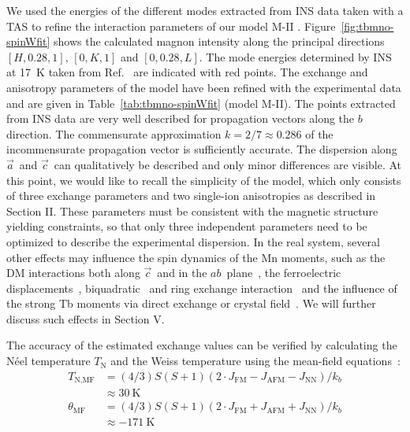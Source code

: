 \documentclass[aps,prb,twocolumn,superscriptaddress,showpacs,floatfix]{revtex4-2}
\newcommand{\aaxis}{$\vec{a}$}
\newcommand{\caxis}{$\vec{c}$}
\newcommand{\abplane}{$ab$}
\newcommand{\bcplane}{$bc$}
\newcommand{\mubohr}{\,$\mu_B$}
\begin{document}
We used the energies of the different modes extracted from INS data taken with a TAS \cite{Senff2007,Senff2008a} to refine the interaction parameters of our model M-II \cite{note-senff}. Figure~\ref{fig:tbmno-spinWfit} shows the calculated magnon intensity along the principal directions $[H,0.28,1]$, $[0,K,1]$ and $[0,0.28,L]$. The mode energies determined by INS at \SI{17}{\kelvin} taken from Ref.~\cite{Senff2007,Senff2008a} are indicated with red points. 
The exchange and anisotropy parameters of the model have been refined with the experimental data and are given in Table~\ref{tab:tbmno-spinWfit} (model M-II).
The points extracted from INS data are very well described for propagation vectors along the $b$ direction.
The commensurate approximation $k=2/7\approx0.286$ of the incommensurate propagation vector is sufficiently accurate. The dispersion along \aaxis\ and \caxis\ can qualitatively be described and only minor differences are visible.
At this point, we would like to recall the simplicity of the model, which only consists of three exchange parameters and two single-ion anisotropies as described in Section II.
These parameters must be consistent with the magnetic structure yielding constraints, so that only three
independent parameters need to be optimized to describe the experimental dispersion.
In the real system, several other effects may influence the spin dynamics of the Mn moments, such as the DM interactions both along \caxis\ and in the \abplane\ plane~\cite{Mochizuki2009}, the ferroelectric displacements~\cite{Malashevich2009a}, biquadratic~\cite{Mochizuki2010c} and ring exchange interaction~\cite{Fedorova2015} and the influence of the strong Tb moments via direct exchange or crystal field~\cite{Prokhnenko2007,Mostovoy2006}.
We will further discuss such effects in Section V.



The accuracy of the estimated exchange values can be verified by calculating the N\'eel temperature $T_{\textrm{N}}$ and the Weiss temperature using the mean-field equations~\cite{Tovar1999}:
\begin{align}
     T_{\textrm{N,MF}} &=(4/3)S(S+1)(2\cdot J_{\textrm{FM}} - J_{\textrm{AFM}} - J_{\textrm{NN}})/k_b\nonumber\\
      & \approx\SI{30}{\kelvin} \\
\theta_{\textrm{MF}} &=(4/3)S(S+1)(2\cdot J_{\textrm{FM}} + J_{\textrm{AFM}} + J_{\textrm{NN}})/k_b\nonumber\\
      & \approx\SI{-171}{\kelvin}
\end{align}
\end{document}
